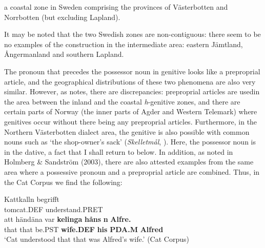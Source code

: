 {{%

\item 

a coastal zone in Sweden comprising the provinces of Västerbotten and Norrbotten (but excluding Lapland).



It may be noted that the two Swedish zones are non-contiguous: there seem to be no examples of the construction in the intermediate area: eastern Jämtland, Ångermanland and southern Lapland. 


The pronoun that precedes the possessor noun in genitive looks like a preproprial article, and the geographical distributions of these two phenomena are also very similar. However, as \citet[67]{Delsing2003b} notes, there are discrepancies: preproprial articles are used\textstyleLinguisticExample{ }in the area between the inland and the coastal \textit{h}{}-genitive zones, and there are certain parts of Norway (the inner parts of Agder and Western Telemark) where genitives occur without there being any preproprial articles. Furthermore, in the Northern Västerbotten dialect area, the genitive is also possible with common nouns such as  ‘the shop-owner’s sack’ (\textit{Skelletmål}, \citet[23]{Marklund1976}). Here, the possessor noun is in the dative, a fact that I shall return to below. In addition, as noted in Holmberg \& Sandström (2003), there are also attested examples from the same area where a possessive pronoun and a preproprial article are combined. Thus, in the Cat Corpus we find the following:


\ea\label{}
\gll Kattkalln  begrifft\\
tomcat.DEF  understand.PRET\\
\gll att  händäna  var  \textbf{kelinga}\textbf{  håns}\textbf{  n}\textbf{  Alfre.}\\
that  that  be.PST  \textbf{wife.DEF} \textbf{his} \textbf{PDA.M} \textbf{Alfred}\\
\glt  ‘Cat understood that that was Alfred’s wife.’ (Cat Corpus)
\z

}}
